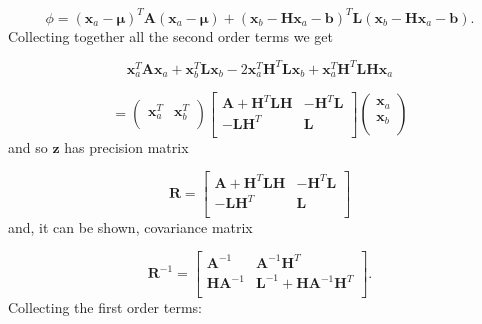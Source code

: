 \documentclass[a4paper, 11pt]{article}
\begin{document}
\begin{equation}
\phi = (\boldsymbol{x}_a-\boldsymbol{\mu})^T \boldsymbol{A} (\boldsymbol{x}_a-\boldsymbol{\mu}) + (\boldsymbol{x}_b-\boldsymbol{Hx}_a-\boldsymbol{b})^T \boldsymbol{L} (\boldsymbol{x}_b-\boldsymbol{Hx}_a-\boldsymbol{b}).
\end{equation}
Collecting together all the second order terms we get

\begin{equation}
\boldsymbol{x}_a^T\boldsymbol{Ax}_a + \boldsymbol{x}_b^T\boldsymbol{Lx}_b - 2\boldsymbol{x}_a^T\boldsymbol{H}^T\boldsymbol{Lx}_b + \boldsymbol{x}_a^T\boldsymbol{H}^T\boldsymbol{LHx}_a
\end{equation}

\begin{equation}
= \left(
    \begin{array}{cc}
      \boldsymbol{x}_a^T & \boldsymbol{x}_b^T \\
    \end{array}
  \right)
  \left[
    \begin{array}{cc}
      \boldsymbol{A} + \boldsymbol{H}^T\boldsymbol{LH} & -\boldsymbol{H}^T\boldsymbol{L} \\
      -\boldsymbol{L}\boldsymbol{H}^T & \boldsymbol{L} \\
    \end{array}
  \right]
  \left(
    \begin{array}{c}
      \boldsymbol{x}_a \\
      \boldsymbol{x}_b \\
    \end{array}
  \right)
\end{equation}
and so $\boldsymbol{z}$ has precision matrix

\begin{equation}
\boldsymbol{R} =  \left[
    \begin{array}{cc}
      \boldsymbol{A} + \boldsymbol{H}^T\boldsymbol{LH} & -\boldsymbol{H}^T\boldsymbol{L} \\
      -\boldsymbol{L}\boldsymbol{H}^T & \boldsymbol{L} \\
    \end{array}
  \right]
\end{equation}
and, it can be shown, covariance matrix

\begin{equation}
\boldsymbol{R}^{-1} =
\left[
  \begin{array}{cc}
    \boldsymbol{A}^{-1} & \boldsymbol{A}^{-1}\boldsymbol{H}^T \\
    \boldsymbol{H}\boldsymbol{A}^{-1} & \boldsymbol{L}^{-1}+\boldsymbol{HA}^{-1}\boldsymbol{H}^T \\
  \end{array}
\right].
\end{equation}
Collecting the first order terms:
\end{document}
